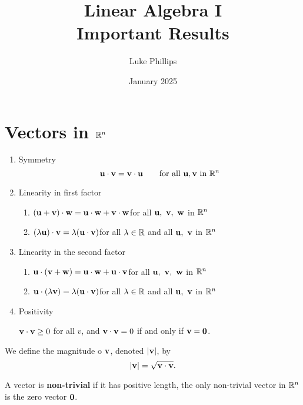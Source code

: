 \documentclass[10pt, a4paper]{article}
\title{Linear Algebra I \\
    \large Important Results}
\author{Luke Phillips}
\date{January 2025}
\begin{document}
\maketitle

\newpage

\tableofcontents

\newpage

\section{Vectors in \texorpdfstring{$\mathbb{R} ^ n$}{}}

\begin{proposition}
    \phantom{}
    \begin{enumerate}[label = (\roman*)]
        \item Symmetry
        \[
        \mathbf{u \cdot v = v \cdot u}\qquad\text{for all }\mathbf{u, v}\text{ in } \mathbb{R} ^ n
        \]
        \item Linearity in first factor
        \begin{enumerate}[label = (\alph*)]
            \item $(\mathbf{u} + \mathbf{v}) \cdot \mathbf{w} = \mathbf{u} \cdot \mathbf{w} + \mathbf{v} \cdot \mathbf{w}$\qquad for all $\mathbf{u,\ v,\ w}$ in $\mathbb{R} ^ n$
            \item $(\lambda\mathbf{u}) \cdot \mathbf{v} = \lambda(\mathbf{u} \cdot \mathbf{v})$\qquad for all $\lambda \in \mathbb{R}$ and all $\mathbf{u,\ v}$ in $\mathbb{R} ^ n$
        \end{enumerate}
        \item Linearity in the second factor
        \begin{enumerate}[label = (\alph*)]
            \item $\mathbf{u} \cdot (\mathbf{v} + \mathbf{w}) = \mathbf{u} \cdot \mathbf{w} + \mathbf{u} \cdot \mathbf{v}$\qquad for all $\mathbf{u,\ v,\ w}$ in $\mathbb{R} ^ n$
            \item $\mathbf{u} \cdot (\lambda\mathbf{v}) = \lambda(\mathbf{u} \cdot \mathbf{v})$\qquad for all $\lambda \in \mathbb{R}$ and all $\mathbf{u,\ v}$ in $\mathbb{R} ^ n$
        \end{enumerate}
        \item Positivity
        
        $\mathbf{v \cdot v} \geq 0$ for all $v$, and $\mathbf{v \cdot v} = 0$ if and only if $\mathbf{v = 0}$.
    \end{enumerate}
\end{proposition}

\begin{definition}[Magnitude]
    We define the magnitude o $\mathbf{v}$,
    denoted $|\mathbf{v}|$,
    by
    \[
    |\mathbf{v}| = \sqrt{\mathbf{v} \cdot \mathbf{v}}.
    \]

    A vector is \textbf{non-trivial} if it has positive length,
    the only non-trivial vector in $\mathbb{R} ^ n$ is the zero vector $\mathbf{0}$.
\end{definition}
\end{document}

